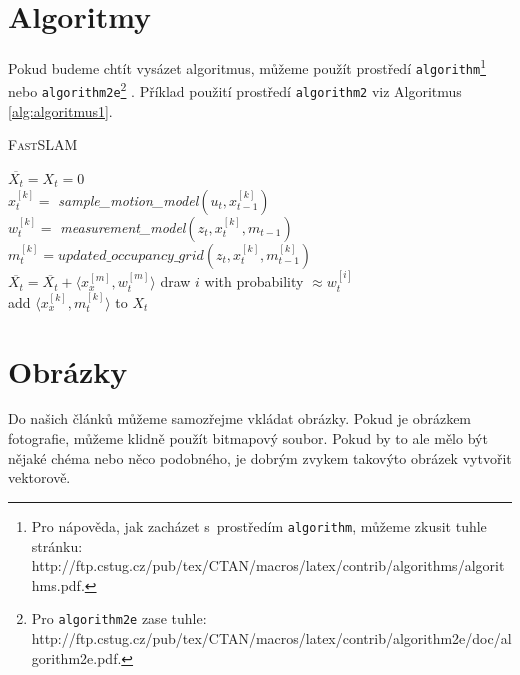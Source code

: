\documentclass[a4paper, 11pt]{article}
\begin{document}
\newpage

\section{Algoritmy} \label{sec:Algoritmy}
Pokud budeme chtít vysázet algoritmus, můžeme použít prostředí \texttt{algorithm}\footnote{Pro nápověda, jak zacházet s~prostředím \texttt{algorithm}, můžeme zkusit tuhle stránku: http://ftp.cstug.cz/pub/tex/CTAN/macros/latex/contrib/algorithms/algorithms.pdf.} nebo \texttt{algorithm2e}\footnote{Pro \texttt{algorithm2e} zase tuhle: http://ftp.cstug.cz/pub/tex/CTAN/macros/latex/contrib/algorithm2e/doc/algorithm2e.pdf.} . Příklad použití prostředí \texttt{algorithm2} viz Algoritmus \ref{alg:algoritmus1}.

\bigskip  
{}
\begin{algorithm}[H]
\caption{\textsc{Fast}SLAM}
\label{alg:algoritmus1}
\SetNlSty{}{}{:  }
\SetInd{1em}{1em}
\SetNlSkip{-1.33em}

\BlankLine
\Indp \Indp
    $\overline{X_t} = X_t = 0$\\
    { 
        $x_t^{[k]} =$ \emph{sample\_motion\_model}$(u_t,x_{t-1}^{[k]})$\\
        $w_t^{[k]} =$ \emph{measurement\_model}$(z_t,x_t^{[k]},m_{t-1})$\\
        $m_t^{[k]} = updated\_occupancy\_grid(z_t,x_t^{[k]},m_{t-1}^{[k]})$\\
        $\overline{X_t} = \overline{X_t} + \langle x_x^{[m]},w_t^{[m]}\rangle$
    }
    {
        draw $i$ with probability $\approx w_t^{[i]}$\\
        add $\langle x_x^{[k]},m_t^{[k]}\rangle$ to $X_t$\\
    }
\end{algorithm}
\bigskip

\section{Obrázky}
Do našich článků můžeme samozřejme vkládat obrázky. Pokud je obrázkem fotografie, můžeme klidně použít bitmapový soubor. Pokud by to ale mělo být nějaké chéma nebo něco podobného, je dobrým zvykem takovýto obrázek vytvořit vektorově.
\end{document}
